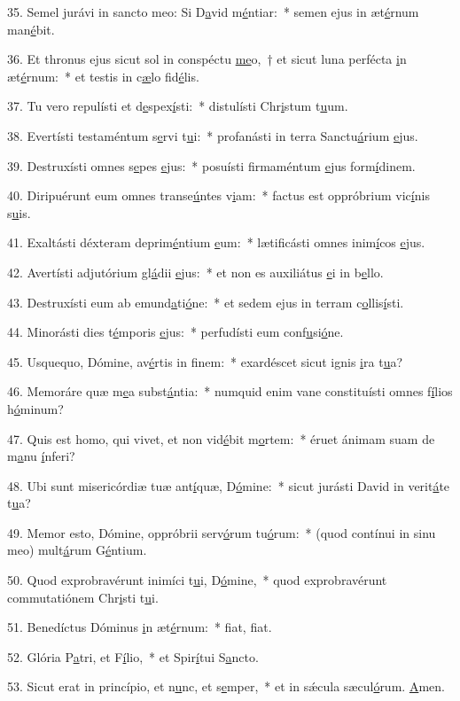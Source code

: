 35. Semel jurávi in sancto meo: Si D\uline{a}vid m\uline{é}ntiar:~* semen ejus in æt\uline{é}rnum man\uline{é}bit.\par 
36. Et thronus ejus sicut sol in conspéctu \uline{me}o,~† et sicut luna perfécta \uline{i}n æt\uline{é}rnum:~* et testis in c\uline{æ}lo fid\uline{é}lis.\par 
37. Tu vero repulísti et d\uline{e}spex\uline{í}sti:~* distulísti Chr\uline{i}stum t\uline{u}um.\par 
38. Evertísti testaméntum s\uline{e}rvi t\uline{u}i:~* profanásti in terra Sanctu\uline{á}rium \uline{e}jus.\par 
39. Destruxísti omnes s\uline{e}pes \uline{e}jus:~* posuísti firmaméntum \uline{e}jus form\uline{í}dinem.\par 
40. Diripuérunt eum omnes transe\uline{ú}ntes v\uline{i}am:~* factus est oppróbrium vic\uline{í}nis s\uline{u}is.\par 
41. Exaltásti déxteram deprim\uline{é}ntium \uline{e}um:~* lætificásti omnes inim\uline{í}cos \uline{e}jus.\par 
42. Avertísti adjutórium gl\uline{á}dii \uline{e}jus:~* et non es auxiliátus \uline{e}i in b\uline{e}llo.\par 
43. Destruxísti eum ab emund\uline{a}ti\uline{ó}ne:~* et sedem ejus in terram c\uline{o}llis\uline{í}sti.\par 
44. Minorásti dies t\uline{é}mporis \uline{e}jus:~* perfudísti eum conf\uline{u}si\uline{ó}ne.\par 
45. Usquequo, Dómine, av\uline{é}rtis in f\uline{i}nem:~* exardéscet sicut ignis \uline{i}ra t\uline{u}a?\par 
46. Memoráre quæ m\uline{e}a subst\uline{á}ntia:~* numquid enim vane constituísti omnes f\uline{í}lios h\uline{ó}minum?\par 
47. Quis est homo, qui vivet, et non vid\uline{é}bit m\uline{o}rtem:~* éruet ánimam suam de m\uline{a}nu \uline{í}nferi?\par 
48. Ubi sunt misericórdiæ tuæ ant\uline{í}quæ, D\uline{ó}mine:~* sicut jurásti David in verit\uline{á}te t\uline{u}a?\par 
49. Memor esto, Dómine, oppróbrii serv\uline{ó}rum tu\uline{ó}rum:~* (quod contínui in sinu meo) mult\uline{á}rum G\uline{é}ntium.\par 
50. Quod exprobravérunt inimíci t\uline{u}i, D\uline{ó}mine,~* quod exprobravérunt commutatiónem Chr\uline{i}sti t\uline{u}i.\par 
51. Benedíctus Dóminus \uline{i}n æt\uline{é}rnum:~* f\uline{i}at, f\uline{i}at.\par 
52. Glória P\uline{a}tri, et F\uline{í}lio,~* et Spir\uline{í}tui S\uline{a}ncto.\par 
53. Sicut erat in princípio, et n\uline{u}nc, et s\uline{e}mper,~* et in sǽcula sæcul\uline{ó}rum. \uline{A}men.\par 
